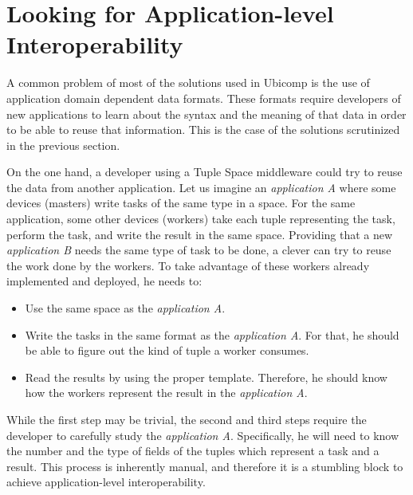 \section{Looking for Application-level Interoperability}
\label{sec:interoperability}

A common problem of most of the solutions used in Ubicomp is the use of application domain dependent data formats.
These formats require developers of new applications to learn about the syntax and the meaning of that data in order to be able to reuse that information.
This is the case of the solutions scrutinized in the previous section.

\medskip

On the one hand, a developer using a Tuple Space middleware could try to reuse the data from another application.
Let us imagine an \emph{application A} where some devices (masters) write tasks of the same type in a space.
For the same application, some other devices (workers) take each tuple representing the task, perform the task, and write the result in the same space.
Providing that a new \emph{application B} needs the same type of task to be done, a clever can try to reuse the work done by the workers.
To take advantage of these workers already implemented and deployed, he needs to:
\begin{itemize}
 \item Use the same space as the \emph{application A}.
 \item Write the tasks in the same format as the \emph{application A}.
	For that, he should be able to figure out the kind of tuple a worker consumes.
 \item Read the results by using the proper template.
	Therefore, he should know how the workers represent the result in the \emph{application A}.
\end{itemize}

While the first step may be trivial, the second and third steps require the developer to carefully study the \emph{application A}.
Specifically, he will need to know the number and the type of fields of the tuples which represent a task and a result.
This process is inherently manual, and therefore it is a stumbling block to achieve application-level interoperability.

